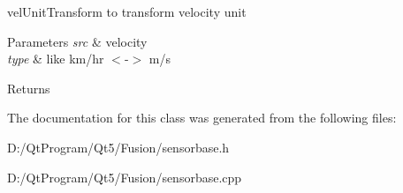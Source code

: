 vel\+Unit\+Transform to transform velocity unit 


\begin{DoxyParams}{Parameters}
{\em src} & velocity \\
\hline
{\em type} & like km/hr $<$-\/$>$ m/s \\
\hline
\end{DoxyParams}
\begin{DoxyReturn}{Returns}

\end{DoxyReturn}


The documentation for this class was generated from the following files\+:\begin{DoxyCompactItemize}
\item 
D\+:/\+Qt\+Program/\+Qt5/\+Fusion/sensorbase.\+h\item 
D\+:/\+Qt\+Program/\+Qt5/\+Fusion/sensorbase.\+cpp\end{DoxyCompactItemize}
